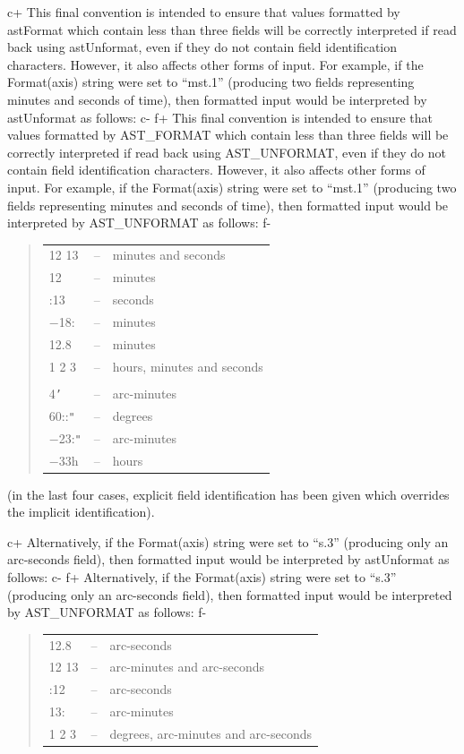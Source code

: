 \documentclass[twoside,11pt]{starlink}
\begin{document}
c+
This final convention is intended to ensure that values formatted by
astFormat which contain less than three fields will be correctly
interpreted if read back using astUnformat, even if they do not
contain field identification characters.  However, it also affects
other forms of input. For example, if the Format(axis) string were set
to ``mst.1'' (producing two fields representing minutes and seconds of
time), then formatted input would be interpreted by astUnformat as
follows:
c-
f+
This final convention is intended to ensure that values formatted by
AST\_FORMAT which contain less than three fields will be correctly
interpreted if read back using AST\_UNFORMAT, even if they do not
contain field identification characters.  However, it also affects
other forms of input. For example, if the Format(axis) string were set
to ``mst.1'' (producing two fields representing minutes and seconds of
time), then formatted input would be interpreted by AST\_UNFORMAT as
follows:
f-

\begin{quote}
\begin{tabular}{lll}
12 13 & -- & minutes and seconds \\
12 & -- & minutes \\
:13 & -- & seconds \\
$-$18: & -- & minutes \\
12.8 & -- & minutes \\
1 2 3 & -- & hours, minutes and seconds \\
& & \\
4\texttt{'} & -- & arc-minutes \\
60::\texttt{"} & -- & degrees \\
$-$23:\texttt{"} & -- & arc-minutes \\
$-$33h & -- & hours
\end{tabular}
\end{quote}

(in the last four cases, explicit field identification has been given
which overrides the implicit identification).

c+
Alternatively, if the Format(axis) string were set to ``s.3''
(producing only an arc-seconds field), then formatted input would be
interpreted by astUnformat as follows:
c-
f+
Alternatively, if the Format(axis) string were set to ``s.3''
(producing only an arc-seconds field), then formatted input would be
interpreted by AST\_UNFORMAT as follows:
f-

\begin{quote}
\begin{tabular}{lll}
12.8 & -- & arc-seconds \\
12 13 & -- & arc-minutes and arc-seconds \\
:12 & -- & arc-seconds \\
13: & -- & arc-minutes \\
1 2 3 & -- & degrees, arc-minutes and arc-seconds
\end{tabular}
\end{quote}
\end{document}
